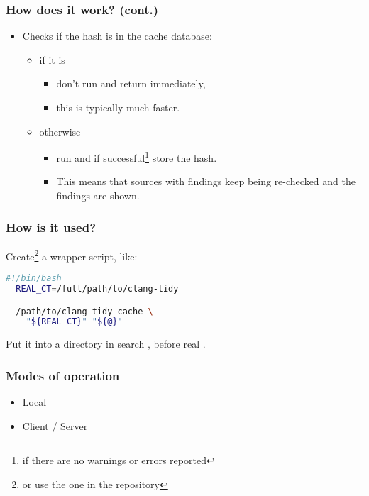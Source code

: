 \documentclass[compress,table,xcolor=table]{beamer}
\begin{document}
\begin{frame}
  \frametitle{How does it work? (cont.)}
    \LARGE
    \begin{itemize}
        \item Checks if the hash is in the cache database:
        \begin{itemize}
            \Large
            \item if it is
            \begin{itemize}
            \item don't run  and return immediately,
            \item this is typically {\larger much} faster.
            \end{itemize}
            \item otherwise
            \begin{itemize}
            \item run  and if
                successful\footnote{if there are no warnings or errors reported}
                store the hash.
            \item This means that {\larger sources with findings keep being
                re-checked} and the findings are shown.
            \end{itemize}
        \end{itemize}
    \end{itemize}
\end{frame}
\begin{frame}[fragile]
  \frametitle{How is it used?}
  \LARGE
  Create\footnote{or use the one in the repository} a wrapper script, like:
  \begin{lstlisting}[language=bash]
  #!/bin/bash
  REAL_CT=/full/path/to/clang-tidy

  /path/to/clang-tidy-cache \
    "${REAL_CT}" "${@}"
  \end{lstlisting}
  Put it into a directory in search , before real
  \cmdname{clang-tidy}.
\end{frame}
\begin{frame}
  \frametitle{Modes of operation}
    \Huge
    \begin{itemize}
        \item Local
        \item Client / Server
    \end{itemize}
\end{frame}
\end{document}
